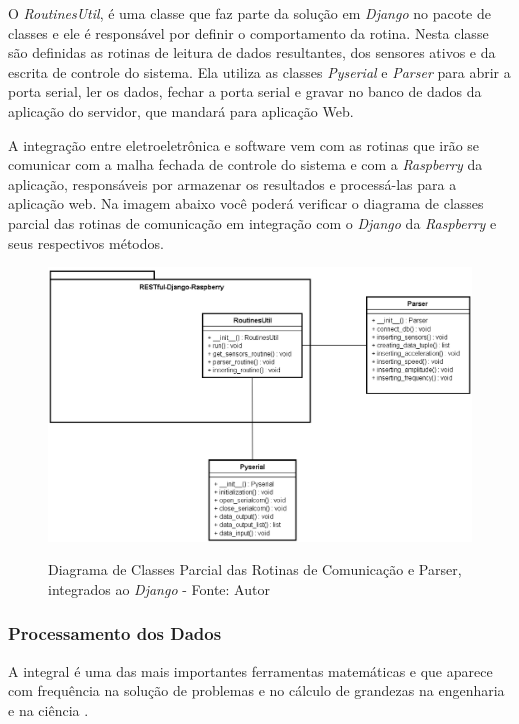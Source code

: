 O \textit{RoutinesUtil}, é uma classe que faz parte da solução em \textit{Django} no pacote de classes e ele é responsável por definir o comportamento 
da rotina. Nesta classe são definidas as rotinas de leitura de dados resultantes, dos sensores ativos e da escrita de controle do sistema. Ela utiliza 
as classes \textit{Pyserial} e \textit{Parser} para abrir a porta serial, ler os dados, fechar a porta serial e gravar no banco de dados da aplicação do 
servidor, que mandará para aplicação Web.

A integração entre eletroeletrônica e software vem com as rotinas que irão se comunicar com a malha fechada de controle do sistema e com a 
\textit{Raspberry} da aplicação, responsáveis por armazenar os resultados e processá-las para a aplicação web. Na imagem abaixo você poderá verificar 
o diagrama de classes parcial das rotinas de comunicação em integração com o \textit{Django} da \textit{Raspberry} e seus respectivos métodos.

\begin{figure}[H]
\centering
\includegraphics[keepaspectratio=true,scale=0.65]{figuras/uml_routines_parser.png}
\label{fig:uml_routines_parser}
\caption{Diagrama de Classes Parcial das Rotinas de Comunicação e Parser, integrados ao \textit{Django} - Fonte: Autor}
\end{figure}

\subsubsection*{\textbf{Processamento dos Dados}} \label{software:processamento}

A integral é uma das mais importantes ferramentas matemáticas e que aparece com frequência na solução de problemas e no cálculo de grandezas 
na engenharia e na ciência \cite{metodos_numericos}.

